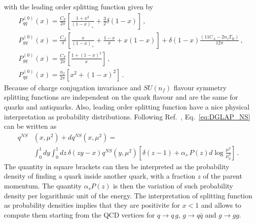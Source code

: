 with the leading order splitting function given by
\begin{align}
    &P_{qq}^{(0)}\left(x\right) = \frac{C_F}{2\pi}\left[\frac{1+x^2}{\left(1-x\right)_+} 
    + \frac{3}{2}\delta\left(1-x\right)\right]\,,\nonumber \\
    &P_{gg}^{(0)}\left(x\right) = \frac{C_A}{\pi}\left[\frac{x}{\left(1-x\right)_+}
    + \frac{1-x}{x} + x\left(1-x\right)\right] 
    +\delta\left(1-x\right)\frac{\left(11C_A - 2n_f T_R\right)}{12\pi}\,, \nonumber \\
    &P_{gq}^{(0)}\left(x\right) = \frac{C_F}{2\pi}\left[\frac{1+\left(1-x\right)^2}{x}\right]\,, \nonumber \\
    &P_{qg}^{(0)}\left(x\right) = \frac{n_f}{2\pi}\left[x^2+\left(1-x\right)^2\right]\,.
\end{align}
Because of charge conjugation invariance and $SU(n_f)$ flavour symmetry splitting functions are independent on the quark
flavour and are the same for quarks and antiquarks. 
Also, leading order splitting function have a nice physical interpretation as probability distributions.
Following Ref.~\cite{ALTARELLI1977298}, Eq.~\eqref{eq:DGLAP_NS} can be written as
\begin{align}
    q^{NS}&\left(x,\mu^2\right) + dq^{NS}\left(x,\mu^2\right) = \nonumber\\
    &\int_0^1 dy\int_0^1 dz\,\delta\left(zy-x\right) q^{NS}\left(y,\mu^2\right) 
    \left[\delta\left(z-1\right) + \alpha_s\, P\left(z\right) d \log\frac{\mu^2}{\mu_0^2}\right]\,.
\end{align}
The quantity in square brackets can then be interpreted as the probability density of finding a quark
inside another quark, with a fraction $z$ of the parent momentum. The quantity $\alpha_s P\left(z\right)$
is then the variation of such probability density per logarithmic unit of the energy. The interpretation
of splitting function as probability densities implies that they are positivite for $x<1$ and allows to compute
them starting from the QCD vertices for $q\rightarrow q\,g$, $g\rightarrow q\bar{q}$ and $g\rightarrow gg$.  

